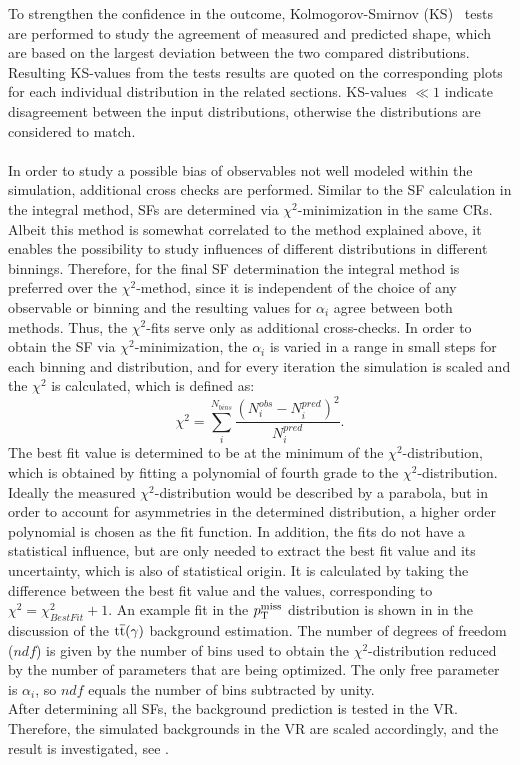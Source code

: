To strengthen the confidence in the outcome, Kolmogorov-Smirnov (KS)~\cite{KS} tests are performed to study the agreement of measured and predicted shape, which are based on the largest deviation between the two compared distributions. Resulting KS-values from the tests results are quoted on the corresponding plots for each individual distribution in the related sections. KS-values $\ll1$ indicate disagreement between the input distributions, otherwise the distributions are considered to match.\\\\
In order to study a possible bias of observables not well modeled within the simulation, additional cross checks are performed. Similar to the SF calculation in the integral method, SFs are determined via $\chi^2$-minimization in the same CRs. Albeit this method is somewhat correlated to the method explained above, it enables the possibility to study influences of different distributions in different binnings. Therefore, for the final SF determination the integral method is preferred over the $\chi^2$-method, since it is independent of the choice of any observable or binning and the resulting values for $\alpha_i$ agree between both methods. Thus, the $\chi^2$-fits serve only as additional cross-checks. In order to obtain the SF via $\chi^2$-minimization, the $\alpha_{i}$ is varied in a range in small steps for each binning and distribution, and for every iteration the simulation is scaled and the $\chi^2$ is calculated, which is defined as:
\begin{equation}
 \chi^2=\sum_i^{N_{bins}} \frac{\left(N_{i}^{obs}-N_{i}^{pred}\right)^2}{N_{i}^{pred}}.
\end{equation}
The best fit value is determined to be at the minimum of the $\chi^2$-distribution, which is obtained by fitting a polynomial of fourth grade to the $\chi^2$-distribution. Ideally the measured $\chi^2$-distribution would be described by a parabola, but in order to account for asymmetries in the determined distribution, a higher order polynomial is chosen as the fit function. In addition, the fits do not have a statistical influence, but are only needed to extract the best fit value and its uncertainty, which is also of statistical origin. It is calculated by taking the difference between the best fit value and the values, corresponding to $\chi^2=\chi^2_{BestFit}+1$. An example fit in the $p_{\mathrm{T}}^\text{miss}$ distribution is shown in  in the discussion of the ${\mathrm{t}\overline{\mathrm{t}}}(\gamma)$ background estimation. The number of degrees of freedom ($ndf$) is given by the number of bins used to obtain the $\chi^2$-distribution reduced by the number of parameters that are being optimized. The only free parameter is $\alpha_{i}$, so $ndf$ equals the number of bins subtracted by unity.\\
After determining all SFs, the background prediction is tested in the VR. Therefore, the simulated backgrounds in the VR are scaled accordingly, and the result is investigated, see .



